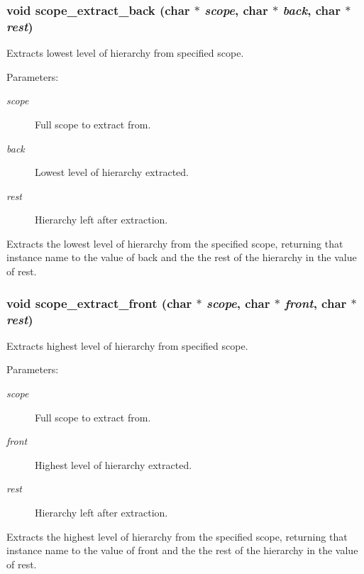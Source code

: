 \subsubsection{\setlength{\rightskip}{0pt plus 5cm}void scope\_\-extract\_\-back (char $\ast$ {\em scope}, char $\ast$ {\em back}, char $\ast$ {\em rest})}\label{util_8h_a10}


Extracts lowest level of hierarchy from specified scope.

\begin{Desc}
\item[Parameters: ]\par
\begin{description}
\item[{\em 
scope}]Full scope to extract from. \item[{\em 
back}]Lowest level of hierarchy extracted. \item[{\em 
rest}]Hierarchy left after extraction.\end{description}
\end{Desc}
Extracts the lowest level of hierarchy from the specified scope, returning that instance name to the value of back and the the rest of the hierarchy in the value of rest. 
\subsubsection{\setlength{\rightskip}{0pt plus 5cm}void scope\_\-extract\_\-front (char $\ast$ {\em scope}, char $\ast$ {\em front}, char $\ast$ {\em rest})}\label{util_8h_a9}


Extracts highest level of hierarchy from specified scope.

\begin{Desc}
\item[Parameters: ]\par
\begin{description}
\item[{\em 
scope}]Full scope to extract from. \item[{\em 
front}]Highest level of hierarchy extracted. \item[{\em 
rest}]Hierarchy left after extraction.\end{description}
\end{Desc}
Extracts the highest level of hierarchy from the specified scope, returning that instance name to the value of front and the the rest of the hierarchy in the value of rest. 
